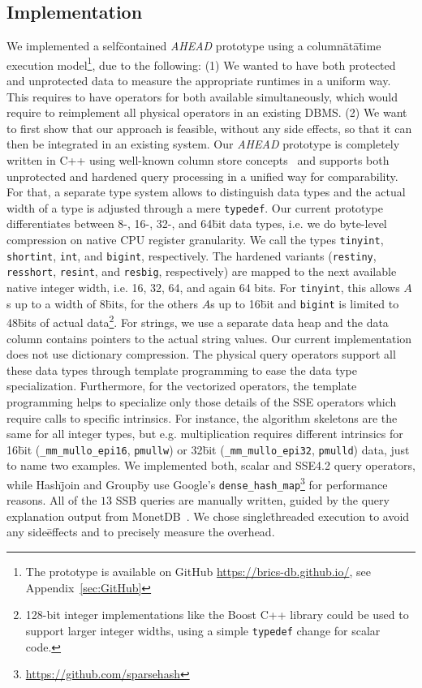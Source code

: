 \subsection{Implementation}
\label{sec:Implementation}
We implemented a self\=contained \emph{AHEAD} prototype using a column\=at\=a\=time execution model\footnote{The prototype is available on GitHub \url{https://brics-db.github.io/}, see Appendix~\ref{sec:GitHub}}, due to the following: (1) We wanted to have both protected and unprotected data to measure the appropriate runtimes in a uniform way. This requires to have operators for both available simultaneously, which would require to reimplement all physical operators in an existing DBMS. (2) We want to first show that our approach is feasible, without any side effects, so that it can then be integrated in an existing system. Our \emph{AHEAD} prototype is completely written in C++ using well-known column store concepts~\cite{DBLP:journals/ftdb/AbadiBHIM13} and supports both unprotected and hardened query processing in a unified way for comparability. For that, a separate type system allows to distinguish data types and the actual width of a type is adjusted through a mere \texttt{typedef}. Our current prototype differentiates between 8-, 16-, 32-, and 64\=bit data types, i.e. we do byte-level compression on native CPU register granularity. We call the types \texttt{tinyint}, \texttt{shortint}, \texttt{int}, and \texttt{bigint}, respectively. The hardened variants (\texttt{restiny}, \texttt{resshort}, \texttt{resint}, and \texttt{resbig}, respectively) are mapped to the next available native integer width, i.e. 16, 32, 64, and again 64 bits. For \texttt{tinyint}, this allows \(A\)s up to a width of 8\=bits, for the others \(A\)s up to 16\=bit and \texttt{bigint} is limited to 48\=bits of actual data\footnote{128-bit integer implementations like the Boost C++ library could be used to support larger integer widths, using a simple \texttt{typedef} change for scalar code.}. For strings, we use a separate data heap and the data column contains pointers to the actual string values. Our current implementation does not use dictionary compression. The physical query operators support all these data types through template programming to ease the data type specialization. Furthermore, for the vectorized operators, the template programming helps to specialize only those details of the SSE operators which require calls to specific intrinsics. For instance, the algorithm skeletons are the same for all integer types, but e.g. multiplication requires different intrinsics for 16\=bit (\texttt{\_mm\_mullo\_epi16}, \texttt{pmullw}) or 32\=bit (\texttt{\_mm\_mullo\_epi32}, \texttt{pmulld}) data, just to name two examples. We implemented both, scalar and SSE4.2 query operators, while Hash\=join and Group\=by use Google's \texttt{dense\_hash\_map}\footnote{\url{https://github.com/sparsehash}} for performance reasons. All of the $13$ SSB queries are manually written, guided by the query explanation output from MonetDB~\cite{boncz2002monet}. We chose single\=threaded execution to avoid any side\=effects and to precisely measure the overhead.





